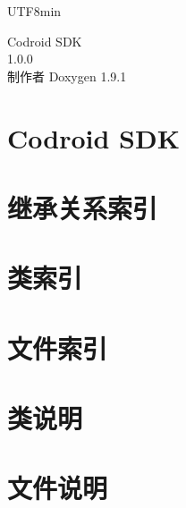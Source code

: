 \let\mypdfximage\pdfximage\def\pdfximage{\immediate\mypdfximage}\documentclass[twoside]{book}
\newcommand{\+}{\discretionary{\mbox{\scriptsize$\hookleftarrow$}}{}{}}
\newcommand{\clearemptydoublepage}{%
  \newpage{\pagestyle{empty}\cleardoublepage}%
}
\begin{document}
\raggedbottom
\begin{CJK}{UTF8}{min}

\begin{titlepage}
\vspace*{7cm}
\begin{center}%
{\Large Codroid SDK \\[1ex]\large 1.\+0.\+0 }\\
\vspace*{1cm}
{\large 制作者 Doxygen 1.9.1}\\
\end{center}
\end{titlepage}
\clearemptydoublepage
{}
\tableofcontents
\clearemptydoublepage
{}

\chapter{Codroid SDK}
\label{index}\hypertarget{index}{}
\chapter{继承关系索引}

\chapter{类索引}

\chapter{文件索引}

\chapter{类说明}

















\chapter{文件说明}




\backmatter
\newpage
{}
\clearemptydoublepage
{}
\printindex

\end{CJK}
\end{document}
